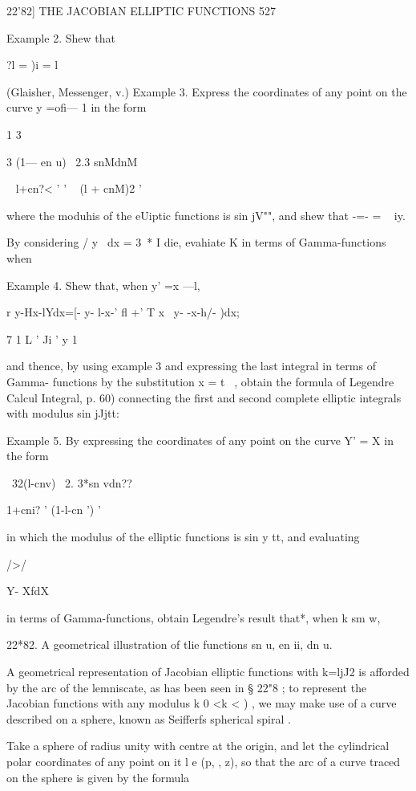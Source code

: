 22'82] THE JACOBIAN ELLIPTIC FUNCTIONS 527

Example 2. Shew that

?l = )i = l

(Glaisher, Messenger, v.) Example 3. Express the coordinates of any
point on the curve y =ofi— 1 in the form

1 3

3 (1— en u) \ 2.3 snMdnM

 ~ l+cn?< ' ' ~ (l + cnM)2 '

where the moduhis of the eUiptic functions is sin jV"", and shew that
-=- = ~ iy.

By considering / y~ dx = 3~* I die, evahiate K in terms of
Gamma-functions when

Example 4. Shew that, when y' =x —l,

r y-Hx-lYdx=[- y- l-x-' fl +' T x~ y- -x-h/- )dx;

7 1 L ' Ji ' y 1

and thence, by using example 3 and expressing the last integral in
terms of Gamma- functions by the substitution x = t~ , obtain the
formula of Legendre Calcul Integral, p. 60) connecting the first and
second complete elliptic integrals with modulus sin jJjtt:

Example 5. By expressing the coordinates of any point on the curve Y'
= X in the form

 \ 32(l-cnv) \ 2. 3*sn vdn??

1+cni? ' (1-l-cn ') '

in which the modulus of the elliptic functions is sin y tt, and
evaluating



 />/



Y- XfdX



in terms of Gamma-functions, obtain Legendre's result that*, when k sm
w,

22*82. A geometrical illustration of tlie functions sn u, en ii, dn u.

A geometrical representation of Jacobian elliptic functions with
k=ljJ2 is afforded by the arc of the lemniscate, as has been seen in §
22"8 ; to represent the Jacobian functions with any modulus k 0 <k < )
, we may make use of a curve described on a sphere, known as Seifferfs
spherical spiral .

Take a sphere of radius unity with centre at the origin, and let the
cylindrical polar coordinates of any point on it l e (p, , z), so that
the arc of a curve traced on the sphere is given by the formula \

